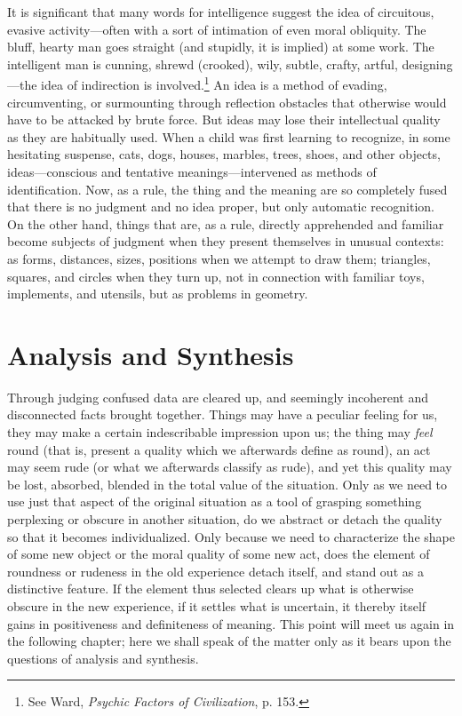 \documentclass[letterpaper]{book}
\begin{document}
It is significant that many words for intelligence suggest the idea of
circuitous, evasive activity---often with a sort of intimation of even
moral obliquity. The bluff, hearty man goes straight (and stupidly, it
is implied) at some work. The intelligent man is cunning, shrewd
(crooked), wily, subtle, crafty, artful, designing---the idea of
indirection is
involved.\footnote{
See Ward, \emph{Psychic Factors of Civilization}, p. 153.
}
An idea is a method of evading, circumventing, or surmounting through
reflection obstacles that otherwise would have to be attacked by brute
force. But ideas may lose their intellectual quality as they are
habitually used. When a child was first learning to recognize, in some
hesitating suspense, cats, dogs, houses, marbles, trees, shoes, and
other objects, ideas---conscious and tentative meanings---intervened as
methods of identification. Now, as a rule, the thing and the meaning are
so completely fused that there is no judgment and no idea proper, but
only automatic recognition. On the other hand, things that are, as a
rule, directly apprehended and familiar become subjects of judgment when
they present themselves in unusual contexts: as forms, distances, sizes,
positions when we attempt to draw them; triangles, squares, and circles
when they turn up, not in connection with familiar toys, implements, and
utensils, but as problems in geometry.

\section{Analysis and Synthesis}


Through judging confused data are cleared up, and seemingly incoherent
and disconnected facts brought together. Things may have a peculiar
feeling for us, they may make a certain indescribable impression upon
us; the thing may \emph{feel} round (that is, present a quality which we
afterwards define as round), an act may seem rude (or what we afterwards
classify as rude), and yet this quality may be lost, absorbed, blended
in the total value of the situation. Only as we need to use just that
aspect of the original situation as a tool of grasping something
perplexing or obscure in another situation, do we abstract or detach the
quality so that it becomes individualized. Only because we need to
characterize the shape of some new object or the moral quality of some
new act, does the element of roundness or rudeness in the old experience
detach itself, and stand out as a distinctive feature. If the element
thus selected clears up what is otherwise obscure in the new experience,
if it settles what is uncertain, it thereby itself gains in positiveness
and definiteness of meaning. This point will meet us again in the
following chapter; here we shall speak of the matter only as it bears
upon the questions of analysis and synthesis.
\end{document}
